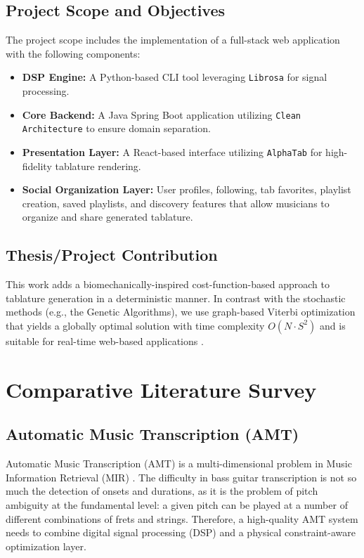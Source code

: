\documentclass[a4paper, 12pt, titlepage]{article}
\begin{document}
\subsection{Project Scope and Objectives}
The project scope includes the implementation of a full-stack web application with the following components:
\begin{itemize}
    \item \textbf{DSP Engine:} A Python-based CLI tool leveraging \texttt{Librosa} for signal processing.
    \item \textbf{Core Backend:} A Java Spring Boot application utilizing \texttt{Clean Architecture} to ensure domain separation.
    \item \textbf{Presentation Layer:} A React-based interface utilizing \texttt{AlphaTab} for high-fidelity tablature rendering.
    \item \textbf{Social Organization Layer:} User profiles, following, tab favorites, playlist creation, saved playlists, and discovery features that allow musicians to organize and share generated tablature.
\end{itemize}


\subsection{Thesis/Project Contribution}
This work adds a biomechanically-inspired cost-function-based approach to tablature generation in a deterministic manner. In contrast with the stochastic methods (e.g., the Genetic Algorithms), we use graph-based Viterbi optimization that yields a globally optimal solution with time complexity $O(N \cdot S^2)$ and is suitable for real-time web-based applications \cite{forney1973,sayegh1989,hori2013}.

\newpage
\section{Comparative Literature Survey}

\subsection{Automatic Music Transcription (AMT)}
Automatic Music Transcription (AMT) is a multi-dimensional problem in Music Information Retrieval (MIR) \cite{klapuri2004,klapuri2006,benetos2013}. The difficulty in bass guitar transcription is not so much the detection of onsets and durations, as it is the problem of pitch ambiguity at the fundamental level: a given pitch can be played at a number of different combinations of frets and strings. Therefore, a high-quality AMT system needs to combine digital signal processing (DSP) and a physical constraint-aware optimization layer.
\end{document}
